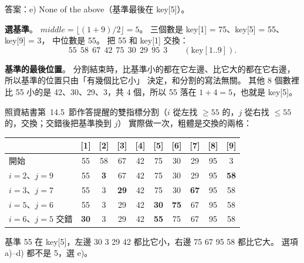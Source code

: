 \begin{pastsoln}
答案：e) None of the above（基準最後在 key[5]）。

\textbf{選基準}。 $\mathit{middle} = \lfloor (1 + 9)/2 \rfloor = 5$。 三個數是 key[1] = 75、key[5] = 55、key[9] = 3，
中位數是 55。 把 55 和 key[1] 交換：
\[
55\ \ 58\ \ 67\ \ 42\ \ 75\ \ 30\ \ 29\ \ 95\ \ 3 \qquad (\text{key}[1..9]).
\]

\textbf{基準的最後位置}。 分割結束時，比基準小的都在它左邊、比它大的都在它右邊，所以基準的位置只由「有幾個比它小」
決定，和分割的寫法無關。 其他 8 個數裡比 55 小的是 42、30、29、3，共 4 個，所以 55 落在 $1 + 4 = 5$，也就是 key[5]。

照資結書第~14.5~節作答提醒的雙指標分割（$i$ 從左找 $\ge 55$ 的，$j$ 從右找 $\le 55$ 的，交換；交錯後把基準換到 $j$）
實際做一次，粗體是交換的兩格：
\begin{center}
\small
\begin{tabular}{l*{9}{c}}
\toprule
 & [1] & [2] & [3] & [4] & [5] & [6] & [7] & [8] & [9] \\
\midrule
開始 & 55 & 58 & 67 & 42 & 75 & 30 & 29 & 95 & 3 \\
$i = 2$、$j = 9$ & 55 & \textbf{3} & 67 & 42 & 75 & 30 & 29 & 95 & \textbf{58} \\
$i = 3$、$j = 7$ & 55 & 3 & \textbf{29} & 42 & 75 & 30 & \textbf{67} & 95 & 58 \\
$i = 5$、$j = 6$ & 55 & 3 & 29 & 42 & \textbf{30} & \textbf{75} & 67 & 95 & 58 \\
$i = 6$、$j = 5$ 交錯 & \textbf{30} & 3 & 29 & 42 & \textbf{55} & 75 & 67 & 95 & 58 \\
\bottomrule
\end{tabular}
\end{center}
基準 55 在 key[5]，左邊 30 3 29 42 都比它小，右邊 75 67 95 58 都比它大。 選項 a)--d) 都不是 5，選 e)。
\end{pastsoln}
